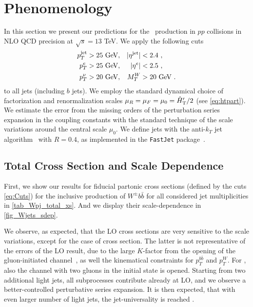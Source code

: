 \section{Phenomenology}
\label{sec:wbb:pheno}
In this section we present our predictions for the \Wbbn~production in
$pp$ collisions in NLO QCD precision at $\sqrt{s}=13$ TeV. 
We apply the following cuts
\begin{align}
  p_T^{\text{jet}}&>25\text{ GeV},& |\eta^{\text{jet}}|&<2.4\ ,\notag\\
  p_T^{e}&>25\text{ GeV},& |\eta^{e}|&<2.5\ ,\notag\\
  p_T^{\nu}&>20\text{ GeV},& M_T^W &> 20\text{ GeV}\ .
  \label{eq:Cuts}
\end{align}
to all jets (including $b$ jets).
We employ the standard dynamical choice of factorization and renormalization scales $\mu_R=\mu_F=\mu_0={\hat H}_{\mathrm T}'/2$ (see \cref{eq:htpart}).
We estimate the error from the missing orders of the perturbation series expansion in the coupling constants with the standard technique of
the scale variations around the central scale $\mu_0$. 
We define jets with the anti-$k_T$ jet algorithm~\cite{antikT} with $R=0.4$, as implemented in the
\texttt{FastJet} package~\cite{Cacciari:2011ma}.

\subsection{Total Cross Section and Scale Dependence}
\label{totalxsw}
First, we show our results for fiducial partonic cross sections (defined by the cuts \cref{eq:Cuts})
for the inclusive production of $W^{\pm}b\bar{b}$ for all considered jet multiplicities in \cref{tab_Wpj_total_xs}.
And we display their scale-dependence in \cref{fig_Wjets_sdep}.

We observe, as expected, that the LO cross sections are very sensitive to the scale variations,
except for the case of \Wbb{} cross section.
The latter is not representative of the errors of the LO result, due
to the large $K$-factor from the opening of the gluon-initiated channel~\cite{Ellis:1998fv,FebresCordero:2006sj,Cordero:2009kv},
as well the kinematical constraints for $p_T^{b\bar b}$ and $p_T^W$.
For \Wbbj{}, also the channel with two gluons in the initial state is opened.
Starting from two additional light jets, all subprocesses contribute already at LO,
and we observe a better-controlled perturbative series expansion.
It is then expected, that with even larger number of light jets,
the jet-universality is reached \cite{BH:Wratios,BH:W5j}.


